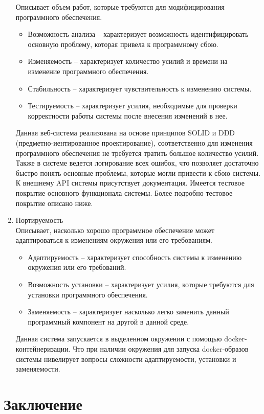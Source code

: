 \documentclass[a4paper,14pt]{extreport} %
\begin{document}
\begin{enumerate}
Описывает объем работ, которые требуются для модифицирования программного обеспечения.
\begin{itemize}
\item Возможность анализа -- характеризует возможность идентифицировать основную проблему, которая привела к программному сбою.
\item Изменяемость -- характеризует количество усилий и времени на изменение программного обеспечения.
\item Стабильность -- характеризует чувствительность к изменению системы.
\item Тестируемость -- характеризует усилия, необходимые для проверки корректности работы системы после внесения изменений в нее.
\end{itemize}
Данная веб-система реализована на основе принципов SOLID и DDD (предметно-иентированное проектирование), соответственно для изменения программного обеспечения не требуется тратить большое количество усилий. Также в системе ведется логирование всех ошибок, что позволяет достаточно быстро понять основные проблемы, которые могли привести к сбою системы. К внешнему API системы присутствует документация. Имеется тестовое покрытие основного функционала системы. Более подробно тестовое покрытие описано ниже.
\item Портируемость \\
Описывает, насколько хорошо программное обеспечение может адаптироваться к изменениям окружения или его требованиям.
\begin{itemize}
\item Адаптируемость -- характеризует способность системы к изменению окружения или его требований.
\item Возможность установки -- характеризует усилия, которые требуются для установки программного обеспечения.
\item Заменяемость -- характеризует насколько легко заменить данный программный компонент на другой в данной среде.
\end{itemize}
Данная система запускается в выделенном окружении с помощью docker-контейнеризации. Что при наличии окружения для запуска docker-образов системы нивелирует вопросы сложности адаптируемости, установки и заменяемости.
\end{enumerate}

\newpage
\chapter{Заключение}
\end{document}

